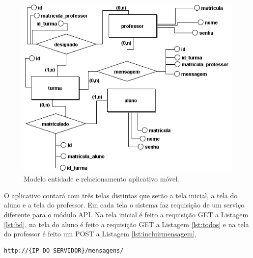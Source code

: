 \begin{figure}[H]
\centering
\includegraphics[scale=0.8]{figuras/entidaderelacionamentomobile}
\caption{Modelo entidade e relacionamento aplicativo móvel.}
\label{fig:entidaderelacionamentomobile}
\end{figure}

O aplicativo contará com três telas distintas que serão a tela inicial, a tela do aluno e a tela do professor. Em cada tela o sistema faz requisição de um serviço diferente para o módulo API. Na tela inicial é feito a requisição GET a Listagem \ref{lst:bd}, na tela do aluno é feito a requisição GET a Listagem \ref{lst:todos} e na tela do professor é feito um POST a Listagem \ref{lst:incluirmensagem},

\begin{lstlisting}[caption={Incluir novas mensagens},label={lst:incluirmensagem}]
	http://{IP DO SERVIDOR}/mensagens/
\end{lstlisting}

